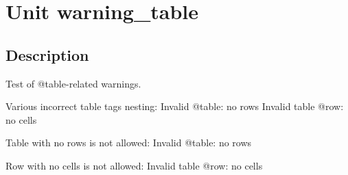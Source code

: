 \documentclass{report}
\begin{document}
\newlength{\tmplength}
\chapter{Unit warning{\_}table}
\section{Description}
Test of @table{-}related warnings.\hfill\vspace*{1ex}



Various incorrect table tags nesting: Invalid @table: no rows Invalid table @row: no cells  

Table with no rows is not allowed: Invalid @table: no rows

Row with no cells is not allowed: Invalid table @row: no cells
\end{document}
